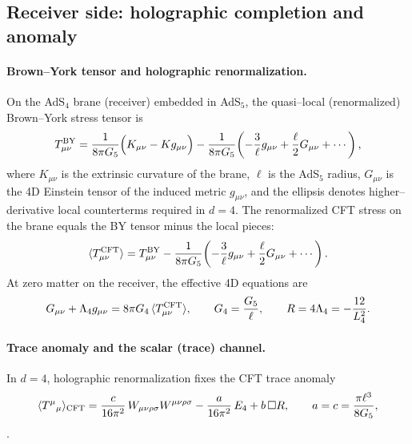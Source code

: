 \documentclass[10pt]{article}
\theoremstyle{definition}
\theoremstyle{plain}
\begin{document}
\subsection{Receiver side: holographic completion and anomaly}
\label{subsec:receiver-anomaly}

\paragraph{Brown–York tensor and holographic renormalization.}\label{par:uom-main-038}
On the AdS$_4$ brane (receiver) embedded in AdS$_5$, the quasi–local (renormalized) Brown–York \cite{BrownYork1993}
stress tensor is
\begin{equation}
T^{\rm BY}_{\mu\nu}
=\frac{1}{8\pi G_5}\Big(K_{\mu\nu}-K g_{\mu\nu}\Big)
-\frac{1}{8\pi G_5}\!\left(-\frac{3}{\ell} g_{\mu\nu}
+\frac{\ell}{2}G_{\mu\nu}
+\cdots\right),
\label{eq:BY}
\end{equation}
where $K_{\mu\nu}$ is the extrinsic curvature of the brane, $\ell$ is the AdS$_5$ radius,
$G_{\mu\nu}$ is the 4D Einstein tensor of the induced metric $g_{\mu\nu}$, and the ellipsis
denotes higher–derivative local counterterms required in $d{=}4$. The renormalized CFT
stress on the brane equals the BY tensor minus the local pieces:
\begin{equation}
\langle T^{\rm CFT}_{\mu\nu}\rangle
= T^{\rm BY}_{\mu\nu}
-\frac{1}{8\pi G_5}\!\left(-\frac{3}{\ell} g_{\mu\nu}
+\frac{\ell}{2}G_{\mu\nu}
+\cdots\right).
\label{eq:CFT-vs-BY}
\end{equation}
At zero matter on the receiver, the effective 4D equations are
\begin{equation}
G_{\mu\nu}+\Lambda_4 g_{\mu\nu}
=8\pi G_4\,\langle T^{\rm CFT}_{\mu\nu}\rangle,
\qquad
G_4=\frac{G_5}{\ell},
\qquad
R=4\Lambda_4=-\frac{12}{L_4^2}.
\label{eq:4D-eff}
\end{equation}

\paragraph{Trace anomaly and the scalar (trace) channel.}\label{par:uom-main-039}
In $d{=}4$, holographic renormalization fixes the CFT trace anomaly
\begin{equation}
\langle T^\mu{}_\mu\rangle_{\rm CFT}
=\frac{c}{16\pi^2}\,W_{\mu\nu\rho\sigma}W^{\mu\nu\rho\sigma}
-\frac{a}{16\pi^2}\,E_4
+b\,\Box R,
\qquad
a=c=\frac{\pi \ell^3}{8G_5},
\label{eq:anomaly}
\end{equation} \cite{HenningsonSkenderis1998}.
\end{document}
